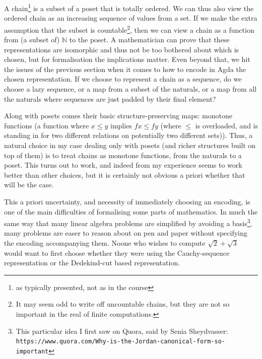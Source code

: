 \documentclass[12pt,a4paper,twoside,openright]{report}
\begin{document}
A chain\footnote{as typically presented, not as in the course} is a subset of a poset that is totally ordered. We can thus also view the ordered chain as an increasing sequence of values from a set. If we make the extra assumption that the subset is countable\footnote{It may seem odd to write off uncountable chains, but they are not so important in the real of finite computations.}, then we can view a chain as a function from (a subset of) $\mathbb{N}$ to the poset. A mathematician can prove that these representations are isomorphic and thus not be too bothered about which is chosen, but for formalisation the implications matter. Even beyond that, we hit the issues of the previous section when it comes to how to encode in Agda the chosen representation. If we choose to represent a chain as a sequence, do we choose a lazy sequence, or a map from a subset of the naturals, or a map from all the naturals where sequences are just padded by their final element? 

Along with posets comes their basic structure-preserving maps: monotone functions (a function where $x \leq y$ implies $f x \leq f y$ (where $\leq$ is overloaded, and is standing in for two different relations on potentially two different sets)). Thus, a natural choice in my case dealing only with posets (and richer structures built on top of them) is to treat chains as monotone functions, from the naturals to a poset. This turns out to work, and indeed from my experience seems to work better than other choices, but it is certainly not obvious a priori whether that will be the case.

This a priori uncertainty, and necessity of immediately choosing an encoding, is one of the main difficulties of formalising some parts of mathematics. In much the same way that many linear algebra problems are simplified by avoiding a basis\footnote{This particular idea I first saw on Quora, said by Senia Sheydvasser: \texttt{https://www.quora.com/Why-is-the-Jordan-canonical-form-so-important}}, many problems are easer to reason about on pen and paper without specifying the encoding accompanying them. Noone who wishes to compute $\sqrt{2} + \sqrt{3}$ would want to first choose whether they were using the Cauchy-sequence representation or the Dedekind-cut based representation. 
\end{document}
